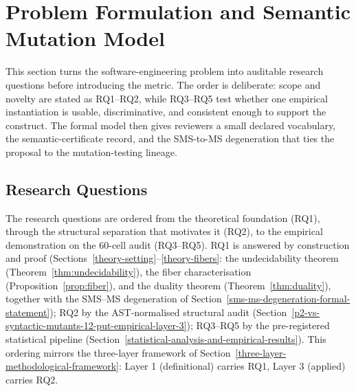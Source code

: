 \documentclass[manuscript,screen,review]{acmart}
\begin{document}
\section{Problem Formulation and Semantic Mutation Model}\label{research-questions-and-hypotheses}

This section turns the software-engineering problem into auditable
research questions before introducing the metric. The order is deliberate:
scope and novelty are stated as RQ1--RQ2, while RQ3--RQ5 test whether
one empirical instantiation is usable, discriminative, and consistent
enough to support the construct. The formal model then gives reviewers a
small declared vocabulary, the semantic-certificate record, and the
SMS-to-MS degeneration that ties the proposal to the mutation-testing
lineage.

\subsection{Research Questions}\label{research-questions}

The research questions are ordered from the theoretical foundation
(RQ1), through the structural separation that motivates it (RQ2), to the
empirical demonstration on the 60-cell audit (RQ3--RQ5). RQ1 is answered
by construction and proof (Sections~\ref{theory-setting}--\ref{theory-fibers}: the undecidability theorem (Theorem~\ref{thm:undecidability}),
the fiber characterisation (Proposition~\ref{prop:fiber}), and the duality theorem (Theorem~\ref{thm:duality}), together
with the SMS--MS degeneration of Section~\ref{sms-ms-degeneration-formal-statement}); RQ2 by the
AST-normalised structural audit (Section~\ref{p2-vs-syntactic-mutants-12-put-empirical-layer-3}); RQ3--RQ5 by the pre-registered
statistical pipeline (Section~\ref{statistical-analysis-and-empirical-results}). This ordering mirrors the three-layer
framework of Section~\ref{three-layer-methodological-framework}: Layer 1 (definitional) carries RQ1, Layer 3 (applied)
carries RQ2.
\end{document}

